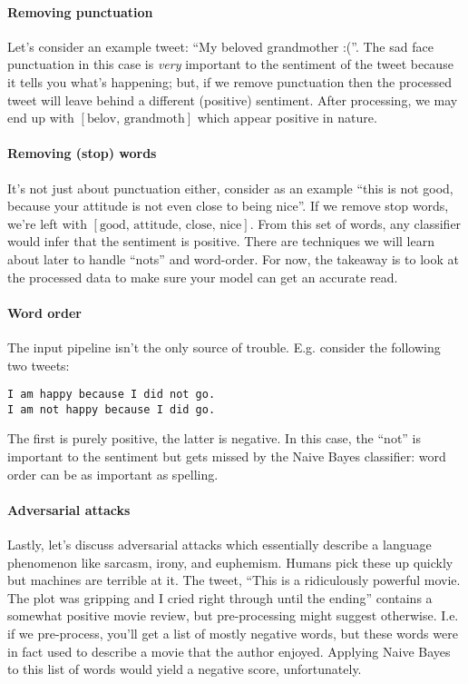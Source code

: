 \documentclass[12pt]{article}
\begin{document}
\paragraph{Removing punctuation}
Let's consider an example tweet: ``My beloved grandmother :(''. The sad face punctuation in this case is \emph{very} important to the sentiment of the tweet because it tells you what's happening; but, if we remove punctuation then the processed tweet will leave behind a different (positive) sentiment. After processing, we may end up with $[\textrm{belov, grandmoth}]$ which appear positive in nature.

\paragraph{Removing (stop) words}
It's not just about punctuation either, consider as an example ``this is not good, because your attitude is not even close to being nice''. If we remove stop words, we're left with $[\textrm{good, attitude, close, nice}]$. From this set of words, any classifier would infer that the sentiment is positive. There are techniques we will learn about later to handle ``nots'' and word-order. For now, the takeaway is to look at the processed data to make sure your model can get an accurate read.

\paragraph{Word order}
The input pipeline isn't the only source of trouble. E.g. consider the following two tweets:

\begin{verbatim}
I am happy because I did not go.
I am not happy because I did go.
\end{verbatim}

The first is purely positive, the latter is negative. In this case, the ``not'' is important to the sentiment but gets missed by the Naive Bayes classifier: word order can be as important as spelling.

\paragraph{Adversarial attacks}
Lastly, let's discuss adversarial attacks which essentially describe a language phenomenon like sarcasm, irony, and euphemism. Humans pick these up quickly but machines are terrible at it. The tweet, ``This is a ridiculously powerful movie. The plot was gripping and I cried right through until the ending'' contains a somewhat positive movie review, but pre-processing might suggest otherwise. I.e. if we pre-process, you'll get a list of mostly negative words, but these words were in fact used to describe a movie that the author enjoyed. Applying Naive Bayes to this list of words would yield a negative score, unfortunately.
\end{document}
